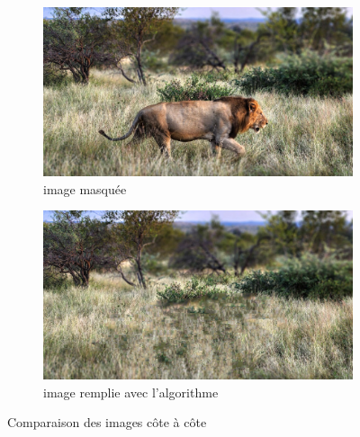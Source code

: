 \documentclass[10pt]{article}
\begin{document}
\begin{figure}[h]
    \centering
    \begin{subfigure}{0.4\textwidth}
        \centering
        \includegraphics[width=\textwidth]{images/lion.png}
        \caption{image masquée}
    \end{subfigure}
    \hfill
    \begin{subfigure}{0.4\textwidth}
        \centering
        \includegraphics[width=\textwidth]{images/lion_inpaint.png}
        \caption{image remplie avec l'algorithme}
    \end{subfigure}
    \caption{Comparaison des images côte à côte}
\end{figure}
\end{document}
